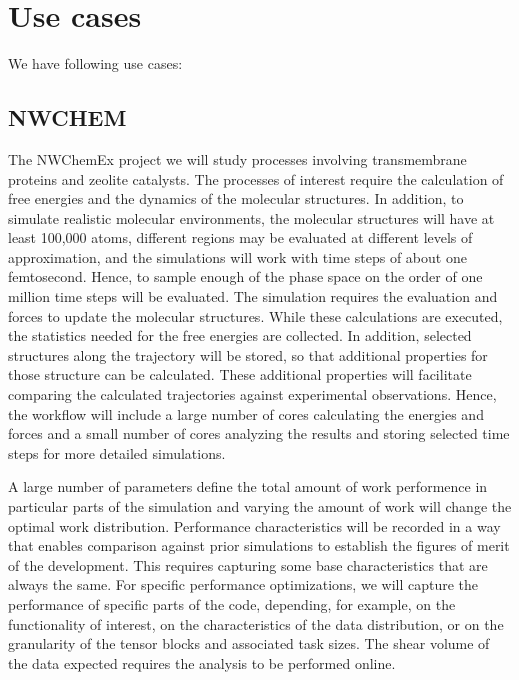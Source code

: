 \section{Use cases}
We have following use cases:

\subsection{NWCHEM}
The NWChemEx project we will study processes involving transmembrane proteins and zeolite catalysts. The processes of interest require the calculation of free energies and the dynamics of the molecular structures. In addition, to simulate realistic molecular environments, the molecular structures will have at least 100,000 atoms, different regions may be evaluated at different levels of approximation, and the simulations will work with time steps of about one femtosecond.  Hence, to sample enough of the phase space on the order of one million time steps will be evaluated. The simulation requires the evaluation and forces to update the molecular structures. While these calculations are executed, the statistics needed for the free energies are collected. In addition, selected structures along the trajectory will be stored, so that additional properties for those structure can be calculated. These additional properties will facilitate comparing the calculated trajectories against experimental observations.  Hence, the workflow will include a large number of cores calculating the energies and forces and a small number of cores analyzing the results and storing selected time steps for more detailed simulations. 

A large number of parameters define the total amount of work performence in particular parts of the simulation and varying the amount of work will change the optimal work distribution. Performance characteristics will be recorded in a way that enables comparison against prior simulations to establish the figures of merit of the development. This requires capturing some base characteristics that are always the same. 
For specific performance optimizations, we will capture the performance of specific parts of the code, depending, for example, on the functionality of interest, on the characteristics of the data distribution, or on the granularity of the tensor blocks and associated task sizes. 
The shear volume of the data expected requires the analysis to be performed online.

